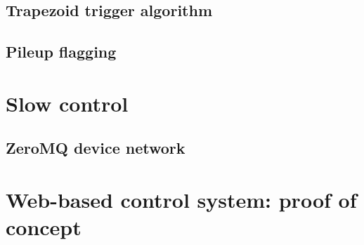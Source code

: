 

\subsection{Trapezoid trigger algorithm}



\subsection{Pileup flagging}



\section{Slow control}



\subsection{ZeroMQ device network}



\section{Web-based control system: proof of concept}

